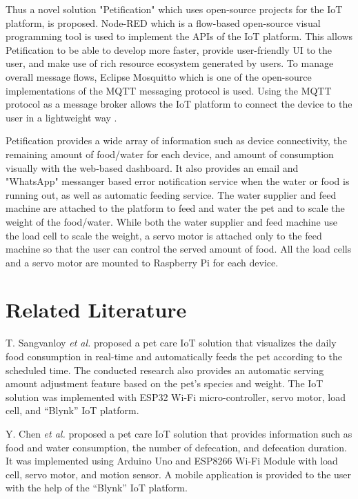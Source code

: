﻿\documentclass[conference]{IEEEtran}
\begin{document}
Thus a novel solution "Petification" which uses open-source projects for the IoT platform, is proposed.
Node-RED which is a flow-based open-source visual programming tool \cite{b7} is used to implement the APIs of the IoT platform.
This allows Petification to be able to develop more faster, provide user-friendly UI to the user, and make use of rich resource ecosystem generated by users. 
To manage overall message flows, Eclipse Mosquitto which is one of the open-source implementations of the MQTT messaging protocol is used.
Using the MQTT protocol as a message broker allows the IoT platform to connect the device to the user in a lightweight way \cite{b8}.

Petification provides a wide array of information such as device connectivity, the remaining amount of food/water for each device, and amount of consumption visually with the web-based dashboard.
It also provides an email and "WhatsApp" messanger based error notification service when the water or food is running out, as well as automatic feeding service.
The water supplier and feed machine are attached to the platform to feed and water the pet and to scale the weight of the food/water.
While both the water supplier and feed machine use the load cell to scale the weight, a servo motor is attached only to the feed machine so that the user can control the served amount of food.
All the load cells and a servo motor are mounted to Raspberry Pi for each device.

\section{Related Literature}
T. Sangvanloy \textit{et al.} \cite{b3} proposed a pet care IoT solution that visualizes the daily food consumption in real-time and automatically feeds the pet according to the scheduled time.
The conducted research also provides an automatic serving amount adjustment feature based on the pet's species and weight.
The IoT solution was implemented with ESP32 Wi-Fi micro-controller, servo motor, load cell, and “Blynk” IoT platform.

Y. Chen \textit{et al.} \cite{b4} proposed a pet care IoT solution that provides information such as food and water consumption, the number of defecation, and defecation duration.
It was implemented using Arduino Uno and ESP8266 Wi-Fi Module with load cell, servo motor, and motion sensor.
A mobile application is provided to the user with the help of the “Blynk” IoT platform.
\end{document}
